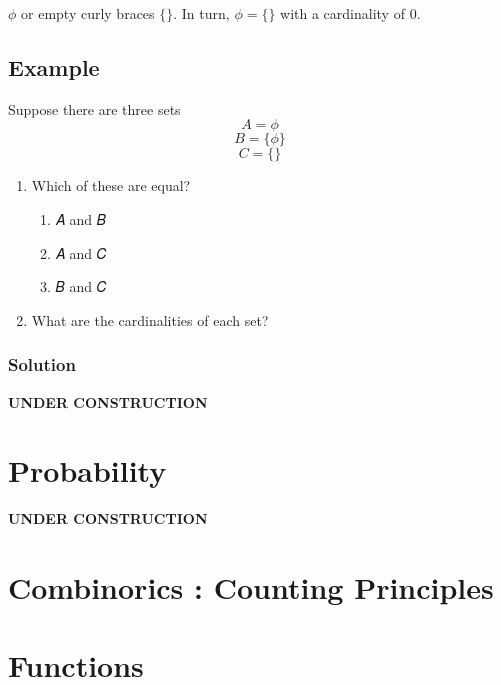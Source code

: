 \documentclass[
  letterpaper,
  DIV=11,
  numbers=noendperiod]{scrreprt}
\providecommand{\tightlist}{%
  \setlength{\itemsep}{0pt}\setlength{\parskip}{0pt}}\usepackage{longtable,booktabs,array}
\begin{document}
\(\phi\) or empty curly braces \(\{\}\). In turn, \(\phi = \{\}\) with a
cardinality of \(0\).

\section{Example}\label{example}

Suppose there are three sets \[A = \phi \] \[B = \{\phi\} \]
\[C = \{\} \]

\begin{enumerate}
\def\labelenumi{\arabic{enumi}.}
\tightlist
\item
  Which of these are equal?

  \begin{enumerate}
  \def\labelenumii{\alph{enumii}.}
  \tightlist
  \item
    𝐴 and 𝐵
  \item
    𝐴 and 𝐶
  \item
    𝐵 and 𝐶
  \end{enumerate}
\item
  What are the cardinalities of each set?
\end{enumerate}

\subsection{Solution}\label{solution}

\textbf{UNDER CONSTRUCTION}


\chapter{Probability}\label{probability}

\textbf{UNDER CONSTRUCTION}


\chapter{Combinorics : Counting
Principles}\label{combinorics-counting-principles}


\chapter{Functions}\label{functions}

\end{document}
